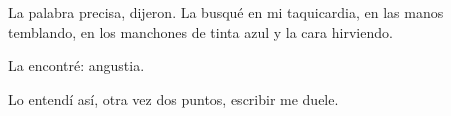 
La palabra precisa, dijeron. La busqué en mi taquicardia, en las manos
temblando, en los manchones de tinta azul y la cara hirviendo. 

La encontré: angustia.

Lo entendí así, otra vez dos puntos, escribir me
duele.

